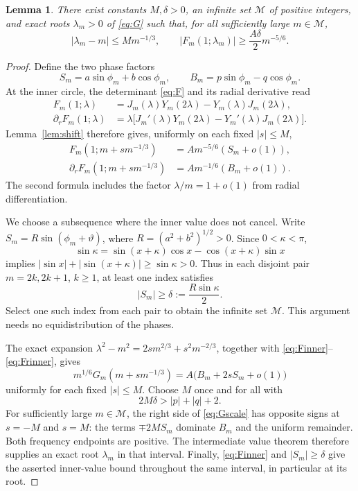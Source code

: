 \documentclass[11pt]{article}
\newtheorem{lemma}{Lemma}
\begin{document}
\begin{lemma}\label{lem:roots}
There exist constants \(M,\delta>0\), an infinite set
\(\mathcal M\) of positive integers, and exact roots
\(\lambda_m>0\) of \eqref{eq:G} such that, for all sufficiently large
\(m\in\mathcal M\),
\[
|\lambda_m-m|\le M m^{-1/3},\qquad
|F_m(1;\lambda_m)|\ge \frac{A\delta}{2}m^{-5/6}.
\]
\end{lemma}

\begin{proof}
Define the two phase factors
\[
S_m=a\sin\phi_m+b\cos\phi_m,\qquad
B_m=p\sin\phi_m-q\cos\phi_m .
\]
At the inner circle, the determinant \eqref{eq:F} and its radial
derivative read
\[
\begin{aligned}
F_m(1;\lambda)&=J_m(\lambda)Y_m(2\lambda)-Y_m(\lambda)J_m(2\lambda),\\
\partial_rF_m(1;\lambda)
&=\lambda\bigl[J_m'(\lambda)Y_m(2\lambda)-Y_m'(\lambda)J_m(2\lambda)\bigr].
\end{aligned}
\]
Lemma~\ref{lem:shift} therefore gives, uniformly on each fixed \(|s|\le M\),
\begin{align}
F_m(1;m+s m^{-1/3})&=A m^{-5/6}(S_m+o(1)),\label{eq:Finner}\\
\partial_rF_m(1;m+s m^{-1/3})
&=A m^{-1/6}(B_m+o(1)).\label{eq:Frinner}
\end{align}
The second formula includes the factor \(\lambda/m=1+o(1)\) from
radial differentiation.

We choose a subsequence where the inner value does not cancel. Write
\(S_m=R\sin(\phi_m+\vartheta)\), where
\(R=(a^2+b^2)^{1/2}>0\). Since \(0<\kappa<\pi\),
\[
\sin\kappa=\sin(x+\kappa)\cos x-\cos(x+\kappa)\sin x
\]
implies \(|\sin x|+|\sin(x+\kappa)|\ge\sin\kappa>0\).
Thus in each disjoint pair \(m=2k,2k+1\), \(k\ge1\), at least one
index satisfies
\[
|S_m|\ge\delta:=\frac{R\sin\kappa}{2}.
\]
Select one such index from each pair to obtain the infinite set
\(\mathcal M\). This argument needs no equidistribution of the phases.

The exact expansion
\(\lambda^2-m^2=2s m^{2/3}+s^2m^{-2/3}\), together with
\eqref{eq:Finner}--\eqref{eq:Frinner}, gives
\begin{equation}\label{eq:Gscale}
m^{1/6}G_m(m+s m^{-1/3})
=A\bigl(B_m+2sS_m+o(1)\bigr)
\end{equation}
uniformly for each fixed \(|s|\le M\). Choose \(M\) once and for all with
\[
2M\delta>|p|+|q|+2.
\]
For sufficiently large \(m\in\mathcal M\), the right side of
\eqref{eq:Gscale} has opposite signs at \(s=-M\) and \(s=M\):
the terms \(\mp2MS_m\) dominate \(B_m\) and the uniform remainder.
Both frequency endpoints are positive. The intermediate value theorem
therefore supplies an exact root \(\lambda_m\) in that interval.
Finally, \eqref{eq:Finner} and \(|S_m|\ge\delta\) give the asserted
inner-value bound throughout the same interval, in particular at its root.
\end{proof}
\end{document}
